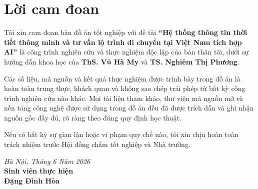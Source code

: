 \chapter*{Lời cam đoan}

Tôi xin cam đoan bản đồ án tốt nghiệp với đề tài \textbf{“Hệ thống thông tin thời tiết thông minh và tư vấn lộ trình di chuyển tại Việt Nam tích hợp AI”} là công trình nghiên cứu và thực nghiệm độc lập của bản thân tôi, dưới sự hướng dẫn khoa học của \textbf{ThS. Vũ Hà My} và \textbf{TS. Nghiêm Thị Phương}.

Các số liệu, mã nguồn và kết quả thực nghiệm được trình bày trong đồ án là hoàn toàn trung thực, khách quan và không sao chép trái phép từ bất kỳ công trình nghiên cứu nào khác. Mọi tài liệu tham khảo, thư viện mã nguồn mở và nền tảng công nghệ được sử dụng trong đồ án đều đã được trích dẫn và ghi nhận nguồn gốc đầy đủ, rõ ràng theo đúng quy định học thuật.

Nếu có bất kỳ sự gian lận hoặc vi phạm quy chế nào, tôi xin chịu hoàn toàn trách nhiệm trước Hội đồng chấm tốt nghiệp và Nhà trường.

\vspace{15mm}
\begin{flushright}
\textit{Hà Nội, Tháng 6 Năm 2026}\\[3mm]
\textbf{Sinh viên thực hiện}\\[15mm]
\textbf{Đặng Đình Hòa}
\end{flushright}
